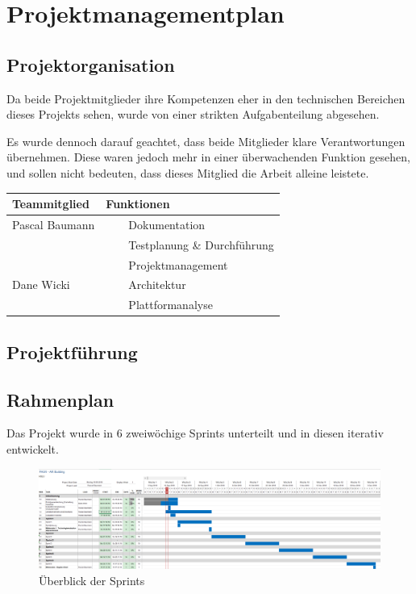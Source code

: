 \documentclass[a4paper]{scrreprt}
\newcommand{\tabitem}{~~\llap{\textbullet}~~}
\begin{document}
\chapter{Projektmanagementplan}

\section{Projektorganisation}
Da beide Projektmitglieder ihre Kompetenzen eher in den technischen Bereichen dieses Projekts sehen, wurde von einer strikten Aufgabenteilung abgesehen.

Es wurde dennoch darauf geachtet, dass beide Mitglieder klare Verantwortungen übernehmen. Diese waren jedoch mehr in einer überwachenden Funktion gesehen, und sollen nicht bedeuten, dass dieses Mitglied die Arbeit alleine leistete.

\vspace{1em}

\begin{tabularx}{\textwidth}{|X|X|}
	\hline
	\textbf{Teammitglied} & \textbf{Funktionen} \\
	\hline
	Pascal Baumann & \tabitem Dokumentation \\
	& \tabitem Testplanung \& Durchführung \\
	& \tabitem Projektmanagement \\
	\hline
	Dane Wicki & \tabitem Architektur \\
	& \tabitem Plattformanalyse \\
	\hline
\end{tabularx}

\newpage
\section{Projektführung}

\section{Rahmenplan}

Das Projekt wurde in 6 zweiwöchige Sprints unterteilt und in diesen iterativ entwickelt.

\vspace{1em}

\begin{figure}[h!]
	\includegraphics[keepaspectratio, width=\textwidth]{Rahmenplan}
	\caption{Überblick der Sprints}
\end{figure}
\end{document}
